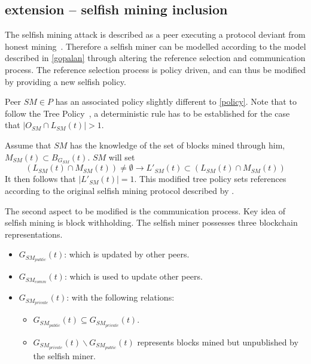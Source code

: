 \subsection{ extension -- selfish mining inclusion}\label{selfishmodel}
The selfish mining attack is described as a peer executing a protocol deviant from honest mining~\citep{eyal}. Therefore a selfish miner can be modelled according to the model described in \ref{gopalan} through altering the reference selection and communication process. The reference selection process is policy driven, and can thus be modified by providing a new selfish policy. 

Peer $SM \in P$ has an associated policy slightly different to \ref{policy}. Note that to follow the Tree Policy~\citep{gopalan}, a deterministic rule has to be established for the case that $|O_{SM} \cap L_{SM}(t)| > 1$.

Assume that $SM$ has the knowledge of the set of blocks mined through him, $M_{SM}(t) \subset B_{G_{SM}}(t)$. $SM$ will set 
\begin{equation}
(L_{SM}(t) \cap M_{SM}(t)) \neq \emptyset \rightarrow L'_{SM}(t) \subset ( L_{SM}(t) \cap M_{SM}(t)) 
\label{smpolicy}
\end{equation}
It then follows that $|L'_{SM}(t)|=1$.
This modified tree policy sets references according to the original selfish mining protocol described by \citeauthor{eyal}.

The second aspect to be modified is the communication process. 
Key idea of selfish mining is block withholding. The selfish miner possesses three blockchain representations. 
\begin{itemize}
\item $G_{SM_{public}}(t)$: which is updated by other peers.
\item $G_{SM_{comm}}(t)$: which is used to update other peers.
\item $G_{SM_{private}}(t)$: with the following relations:
		\begin{itemize}
		\item $G_{SM_{public}}(t)\subseteq G_{SM_{private}}(t)$.
		\item $G_{SM_{private}}(t)\backslash G_{SM_{public}}(t)$ represents blocks mined but unpublished by the selfish miner.
\end{itemize}		
\end{itemize}


